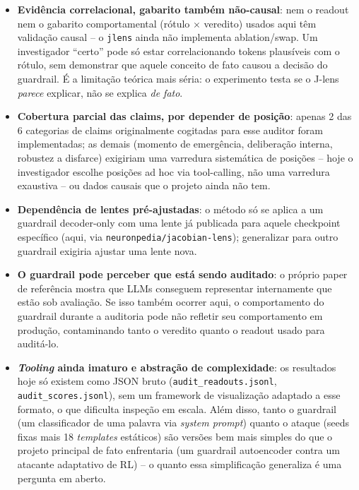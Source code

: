 \documentclass{article}
\begin{document}
\begin{itemize}
  \item \textbf{Evidência correlacional, gabarito também não-causal}: nem o
  readout nem o gabarito comportamental (rótulo $\times$ veredito) usados
  aqui têm validação causal -- o \texttt{jlens} ainda não implementa
  ablation/swap. Um investigador ``certo'' pode só estar correlacionando
  tokens plausíveis com o rótulo, sem demonstrar que aquele conceito de fato
  causou a decisão do guardrail. É a limitação teórica mais séria: o
  experimento testa se o J-lens \emph{parece} explicar, não se explica
  \emph{de fato}.

  \item \textbf{Cobertura parcial das claims, por depender de posição}:
  apenas 2 das 6 categorias de claims originalmente cogitadas para esse
  auditor foram implementadas; as demais (momento de emergência, deliberação
  interna, robustez a disfarce) exigiriam uma varredura sistemática de
  posições -- hoje o investigador escolhe posições ad hoc via tool-calling,
  não uma varredura exaustiva -- ou dados causais que o projeto ainda não
  tem.

  \item \textbf{Dependência de lentes pré-ajustadas}: o método só se aplica
  a um guardrail decoder-only com uma lente já publicada para aquele
  checkpoint específico (aqui, via \texttt{neuronpedia/jacobian-lens});
  generalizar para outro guardrail exigiria ajustar uma lente nova.

  \item \textbf{O guardrail pode perceber que está sendo auditado}: o
  próprio paper de referência mostra que LLMs conseguem representar
  internamente que estão sob avaliação. Se isso também ocorrer aqui, o
  comportamento do guardrail durante a auditoria pode não refletir seu
  comportamento em produção, contaminando tanto o veredito quanto o readout
  usado para auditá-lo.

  \item \textbf{\emph{Tooling} ainda imaturo e abstração de complexidade}:
  os resultados hoje só existem como JSON bruto
  (\texttt{audit\_readouts.jsonl}, \texttt{audit\_scores.jsonl}), sem um
  framework de visualização adaptado a esse formato, o que dificulta
  inspeção em escala. Além disso, tanto o guardrail (um classificador de uma
  palavra via \emph{system prompt}) quanto o ataque (seeds fixas mais 18
  \emph{templates} estáticos) são versões bem mais simples do que o projeto
  principal de fato enfrentaria (um guardrail autoencoder contra um
  atacante adaptativo de RL) -- o quanto essa simplificação generaliza é uma
  pergunta em aberto.
\end{itemize}
\end{document}
